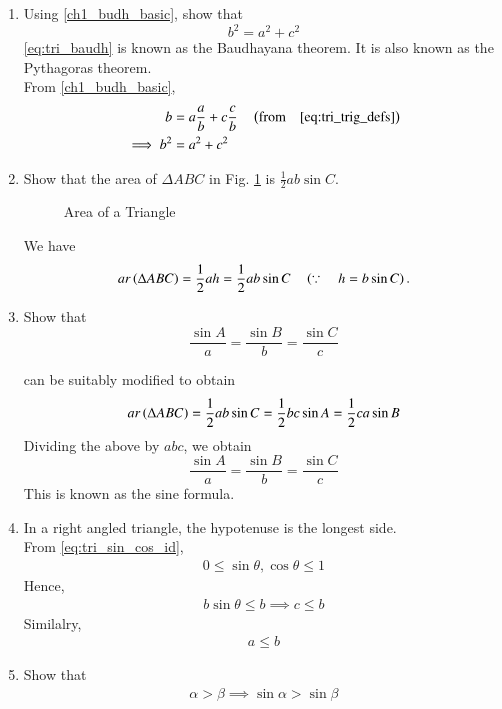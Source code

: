 \begin{enumerate}[label=\thesection.\arabic*.,ref=\thesection.\theenumi]
\item
	Using \eqref{ch1_budh_basic}, show that
	\begin{equation}
	\label{eq:tri_baudh}
	b^2 = a^2 + c^2
	\end{equation}
	\eqref{eq:tri_baudh} is known as the Baudhayana theorem.  It is also known as the Pythagoras theorem.
\\
\solution From \eqref{ch1_budh_basic},
\begin{align}
b &= a\frac{a}{b} + c \frac{c}{b} \quad \left(\text{from} \quad \eqref{eq:tri_trig_defs}\right)\\
\implies b^2 &= a^2 + c^2
\end{align}
%
\item
\label{prob:tri_area_sin}
	Show that the area of $\Delta ABC$ in Fig. 	\ref{fig:tri_sss}	is $\frac{1}{2}ab \sin C$.
\begin{figure}[!ht]
	\begin{center}
			\resizebox{0.6\columnwidth}{!}{}
	\end{center}
	\caption{Area of a Triangle}
	\label{fig:tri_sss}	
\end{figure}

\solution We have
%
\begin{equation}
ar\left(\Delta ABC\right) = \frac{1}{2}ah = \frac{1}{2}ab\sin C \quad \left(\because \quad h = b \sin C\right).
\label{eq:tri_area_sin}
\end{equation}

\item
	Show that 
	\begin{equation}
	\frac{\sin A}{a} = \frac{\sin B}{b} = \frac{\sin C}{c}
	\end{equation}

\solution 
{} can be suitably modified to obtain 
\begin{align}
ar\left(\Delta ABC\right) = 
\frac{1}{2}ab\sin C = \frac{1}{2}bc\sin A = \frac{1}{2}ca\sin B
	\label{tri:area-sin}
\end{align}
Dividing the above by $abc$, we obtain
	\begin{equation}
\label{eq:tri_sin_form}
	\frac{\sin A}{a} = \frac{\sin B}{b} = \frac{\sin C}{c}
	\end{equation}
This is known as the sine formula.	
%
\item In a right angled triangle, the hypotenuse is the longest side.
\label{them:hyp_largest}
\\
\solution From 
\eqref{eq:tri_sin_cos_id},
\begin{align}
	0 \le \sin \theta, \cos \theta \le 1
\end{align}
Hence, 
\begin{align}
	b \sin \theta \le b \implies  c \le b
\end{align}
Similalry,
\begin{align}
	a \le b
\end{align}
%
\item Show that 
%
\begin{align}
\label{eq:trig_id_sin_inc}
\alpha > \beta \implies \sin \alpha > \sin \beta
\end{align}
%


\end{enumerate}
